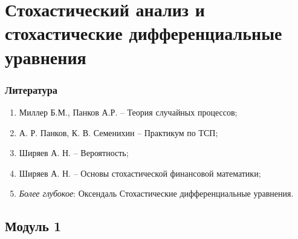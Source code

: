 \documentclass[../konspect.tex]{subfiles}
\begin{document}
  \part{Стохастический анализ и стохастические дифференциальные уравнения}

  \section*{Литература}
  \begin{enumerate}
    \item Миллер Б.М., Панков А.Р. -- Теория случайных процессов;
    \item А. Р. Панков, К. В. Семенихин -- Практикум по ТСП;
    \item Ширяев А. Н. -- Вероятность;
    \item Ширяев А. Н. -- Основы стохастической финансовой математики;

    \item \textit{Более глубокое}: Оксендаль Стохастические дифференциальные уравнения.
  \end{enumerate}

  \chapter{Модуль 1}
  
  
  
  
  
  
  
\end{document}
